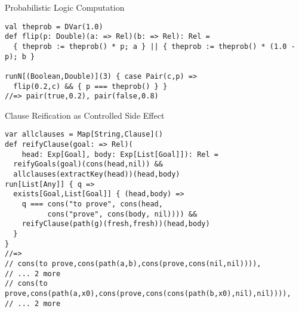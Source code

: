 \documentclass{beamer}
\begin{document}
\begin{frame}[fragile]{Probabilistic Logic Computation}
\begin{verbatim}
val theprob = DVar(1.0)
def flip(p: Double)(a: => Rel)(b: => Rel): Rel =
  { theprob := theprob() * p; a } || { theprob := theprob() * (1.0 - p); b }

runN[(Boolean,Double)](3) { case Pair(c,p) =>
  flip(0.2,c) && { p === theprob() } }
//=> pair(true,0.2), pair(false,0.8)
\end{verbatim}
\end{frame}

\begin{frame}[fragile]{Clause Reification as Controlled Side Effect}
\begin{verbatim}
var allclauses = Map[String,Clause]()
def reifyClause(goal: => Rel)(
    head: Exp[Goal], body: Exp[List[Goal]]): Rel =
  reifyGoals(goal)(cons(head,nil)) &&
  allclauses(extractKey(head))(head,body)
run[List[Any]] { q =>
  exists[Goal,List[Goal]] { (head,body) =>
    q === cons("to prove", cons(head, 
          cons("prove", cons(body, nil)))) &&
    reifyClause(path(g)(fresh,fresh))(head,body)
  }
}
//=>
// cons(to prove,cons(path(a,b),cons(prove,cons(nil,nil)))),
// ... 2 more
// cons(to prove,cons(path(a,x0),cons(prove,cons(cons(path(b,x0),nil),nil)))), 
// ... 2 more
\end{verbatim}
\end{frame}
\end{document}
